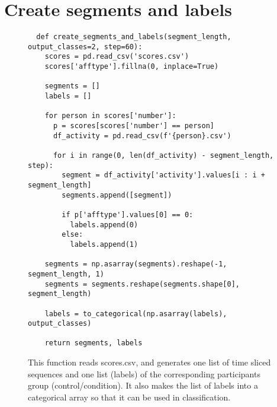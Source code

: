 \section{Create segments and labels}
\begin{figure}[!ht]
\begin{code}
  \begin{verbatim}
  def create_segments_and_labels(segment_length, output_classes=2, step=60):
    scores = pd.read_csv('scores.csv')
    scores['afftype'].fillna(0, inplace=True)
    
    segments = []
    labels = []

    for person in scores['number']:
      p = scores[scores['number'] == person]
      df_activity = pd.read_csv(f'{person}.csv')

      for i in range(0, len(df_activity) - segment_length, step):
        segment = df_activity['activity'].values[i : i + segment_length]
        segments.append([segment])

        if p['afftype'].values[0] == 0: 
          labels.append(0)
        else:
          labels.append(1)

    segments = np.asarray(segments).reshape(-1, segment_length, 1)
    segments = segments.reshape(segments.shape[0], segment_length)

    labels = to_categorical(np.asarray(labels), output_classes)
    
    return segments, labels
  \end{verbatim}
  \caption{This function reads scores.csv, and generates one list of time sliced sequences and one list (labels) of the corresponding participants group (control/condition). It also makes the list of labels into a categorical array so that it can be used in classification.}
  \label{code:reading_dataset}
\end{code}
\end{figure}